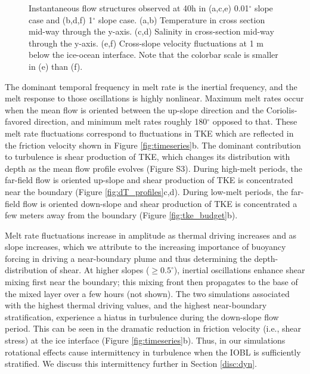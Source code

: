 \documentclass[draft]{agujournal2019}
\begin{document}
\begin{figure}[]
\begin{minipage}{0.6\textwidth}
    \end{minipage}%
    \begin{minipage}{0.05\textwidth}
    \hfill
    \end{minipage}
    \caption{Instantaneous flow structures observed at 40h in (a,c,e) 0.01$^{\circ}$ slope case and (b,d,f) 1$^{\circ}$ slope case. (a,b) Temperature in cross section mid-way through the y-axis. (c,d) Salinity in cross-section mid-way through the y-axis. (e,f) Cross-slope velocity fluctuations at 1 m below the ice-ocean interface. Note that the colorbar scale is smaller in (e) than (f).}
    \label{fig:cross-section}
\end{figure}

The dominant temporal frequency in melt rate is the inertial frequency, and the melt response to those oscillations is highly nonlinear. Maximum melt rates occur when the mean flow is oriented between the up-slope direction and the Coriolis-favored direction, and minimum melt rates roughly 180$^{\circ}$ opposed to that. These melt rate fluctuations correspond to fluctuations in TKE which are reflected in the friction velocity shown in Figure \ref{fig:timeseries}b. The dominant contribution to turbulence is shear production of TKE, which changes its distribution with depth as the mean flow profile evolves (Figure S3). During high-melt periods, the far-field flow is oriented up-slope and shear production of TKE is concentrated near the boundary (Figure \ref{fig:dT_profiles}c,d). During low-melt periods, the far-field flow is oriented down-slope and shear production of TKE is concentrated a few meters away from the boundary (Figure \ref{fig:tke_budget}b). 

Melt rate fluctuations increase in amplitude as thermal driving increases and as slope increases, which we attribute to the increasing importance of buoyancy forcing in driving a near-boundary plume and thus determining the depth-distribution of shear. At higher slopes ($\geq 0.5^{\circ}$), inertial oscillations enhance shear mixing first near the boundary; this mixing front then propagates to the base of the mixed layer over a few hours (not shown). The two simulations associated with the highest thermal driving values, and the highest near-boundary stratification, experience a hiatus in turbulence during the down-slope flow period. This can be seen in the dramatic reduction in friction velocity (i.e., shear stress) at the ice interface (Figure \ref{fig:timeseries}b). Thus, in our simulations rotational effects cause intermittency in turbulence when the IOBL is sufficiently stratified. We discuss this intermittency further in Section \ref{disc:dyn}.
\end{document}
